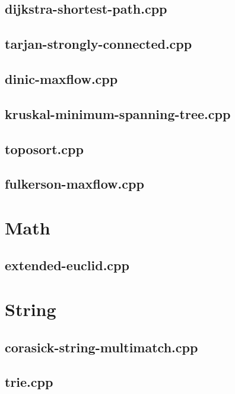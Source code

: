 \documentclass[10pt,twocolumn,landscape]{article}
\begin{document}
\subsection{dijkstra-shortest-path.cpp}


\subsection{tarjan-strongly-connected.cpp}


\subsection{dinic-maxflow.cpp}


\subsection{kruskal-minimum-spanning-tree.cpp}


\subsection{toposort.cpp}


\subsection{fulkerson-maxflow.cpp}


\section{Math}

\subsection{extended-euclid.cpp}


\section{String}

\subsection{corasick-string-multimatch.cpp}


\subsection{trie.cpp}

\end{document}
